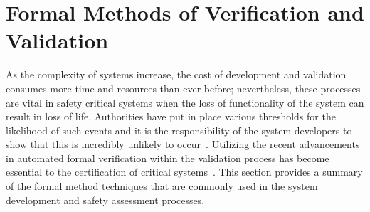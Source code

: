 \section{Formal Methods of Verification and Validation}
\label{sec:fm}
As the complexity of systems increase, the cost of development and validation consumes more time and resources than ever before; nevertheless, these processes are vital in safety critical systems when the loss of functionality of the system can result in loss of life. Authorities have put in place various thresholds for the likelihood of such events and it is the responsibility of the system developers to show that this is incredibly unlikely to occur~\cite{faaSA}. Utilizing the recent advancements in automated formal verification within the validation process has become essential to the certification of critical systems~\cite{deptOfDefense,standard1999,prasad2005survey}. This section provides a summary of the formal method techniques that are commonly used in the system development and safety assessment processes.

 



%